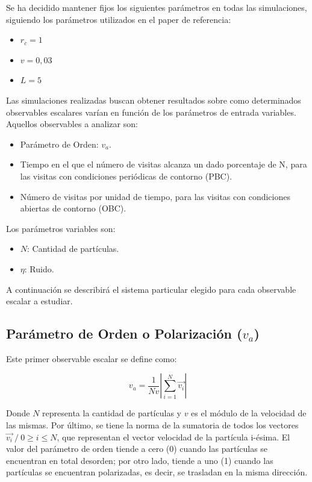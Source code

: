 \documentclass[11pt, a4paper]{article}
\begin{document}
        Se ha decidido mantener fijos los siguientes parámetros en todas las simulaciones, siguiendo los parámetros utilizados en el paper de referencia:
        \begin{itemize}
            \item $r_c = 1$
            \item $v = 0,03$
            \item $L = 5$
        \end{itemize}

        Las simulaciones realizadas buscan obtener resultados sobre como determinados observables escalares varían
        en función de los parámetros de entrada variables.
        Aquellos observables a analizar son:
        \begin{itemize}
            \item Parámetro de Orden: $v_a$.
            \item Tiempo en el que el número de visitas alcanza un dado porcentaje de N, para las visitas con condiciones periódicas de contorno (PBC).
            \item Número de visitas por unidad de tiempo, para las visitas con condiciones abiertas de contorno (OBC).
        \end{itemize}

        Los parámetros variables son:

        \begin{itemize}
            \item $N$: Cantidad de partículas.
            \item $\eta$: Ruido.
        \end{itemize}

        A continuación se describirá el sistema particular elegido para cada observable escalar a estudiar.

        \subsection{Parámetro de Orden o Polarización ($v_a$)}
        \label{subsec:polarizacion}

            Este primer observable escalar se define como:

            \begin{equation}
                v_a = \frac{1}{Nv} \left|\sum_{i=1}^{N} \vec{v_i} \right|
            \end{equation}

            Donde $N$ representa la cantidad de partículas y $v$ es el módulo de la velocidad de las mismas.
            Por último, se tiene la norma de la sumatoria de todos los vectores $\vec{v_i} \ / \  0 \geq i \leq N$,
            que representan el vector velocidad de la partícula i-ésima.
            El valor del parámetro de orden tiende a cero (0) cuando las partículas se encuentran en total desorden;
            por otro lado, tiende a uno (1) cuando las partículas se encuentran polarizadas, es decir, se trasladan en la misma dirección.
\end{document}
